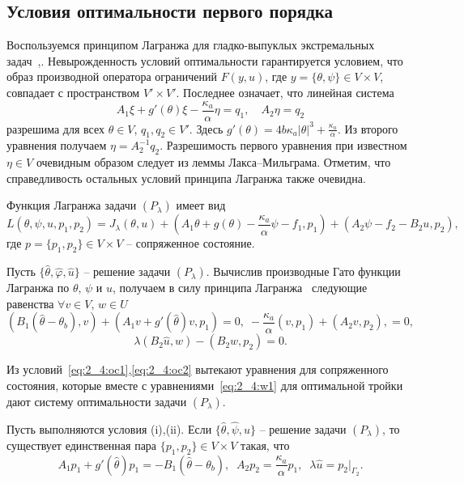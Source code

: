 \subsection{Условия оптимальности первого порядка}
\label{subsec:ch2/sec4/optimality}

Воспользуемся принципом Лагранжа для
гладко-выпуклых экстремальных задач~\cite{10},\cite{11}.
Невырожденность условий оптимальности гарантируется условием, что образ
производной оператора ограничений $F(y, u)$, где $y=\{\theta, \psi\} \in V\times V$,
совпадает с пространством $V' \times V'$.
Последнее означает, что линейная система
\[
    A_1\xi + g'(\theta)\xi - \frac{\kappa_a}{\alpha}\eta = q_1, \quad
    A_2\eta = q_2
\]
разрешима для всех $\theta\in V$, $q_1,q_2\in V'$.
Здесь $g'(\theta)=4b\kappa_a|\theta|^3+\frac{\kappa_a}{\alpha}$.
Из второго уравнения получаем $\eta = A_2^{-1}q_2$.
Разрешимость первого уравнения при известном $\eta\in V$
очевидным образом следует из леммы Лакса--Мильграма.
Отметим, что справедливость остальных условий принципа Лагранжа также очевидна.

Функция Лагранжа задачи $(P_\lambda)$
имеет вид
\[
    L (\theta, \psi, u, p_1, p_2) = J_\lambda(\theta, u)
    + \left( A_1 \theta + g (\theta)
    - \frac{\kappa_a}{\alpha}\psi - f_1, p_1 \right)
    + (A_2 \psi - f_2 - B_2 u, p_2),
\]
где $p=\{p_1,p_2\}\in V\times V$ -- сопряженное состояние.

Пусть $\{\hat{\theta}, \hat{\varphi}, \hat{u} \}$ -- решение задачи $(P_\lambda)$.
Вычислив производные Гато функции Лагранжа по $\theta,\,\psi$ и $u$, получаем
в силу принципа Лагранжа~\cite[Теорема 1.5]{10} следующие равенства
$\forall v\in V,\, w\in U$
\begin{equation}
    \label{eq:2_4:oc1}
    (B_1(\hat{\theta} -\theta_b), v) + (A_1 v + g'(\hat{\theta})v, p_1)=0,\;
    -\frac{\kappa_a}{\alpha}(v ,p_1)+ (A_2 v,p_2), = 0,
\end{equation}
\begin{equation}
    \label{eq:2_4:oc2}
    \lambda(B_2\hat{u},w) - (B_2 w, p_2) = 0.
\end{equation}

Из условий~\eqref{eq:2_4:oc1},\eqref{eq:2_4:oc2}
вытекают уравнения для сопряженного состояния,
которые вместе с уравнениями~\eqref{eq:2_4:w1}
для оптимальной тройки дают систему оптимальности задачи $(P_\lambda)$.

\begin{theorem}
    Пусть выполняются условия (i),(ii).
    Если $\{\hat{\theta}, \hat{\psi}, \hat{u}\}$ -- решение
    задачи $(P_\lambda)$, то существует единственная пара
    $\{p_1, p_2 \} \in V\times V$ такая, что
    \begin{equation}
        \label{eq:2_4:as}
        A_1 p_1+g'(\hat{\theta}) p_1=-B_1(\hat{\theta} -\theta_b),\;\;
        A_2 p_2=\frac{\kappa_a}{\alpha}p_1,\;\;
        \lambda\hat{u}=p_2|_{\Gamma_2}.
    \end{equation}
\end{theorem}

